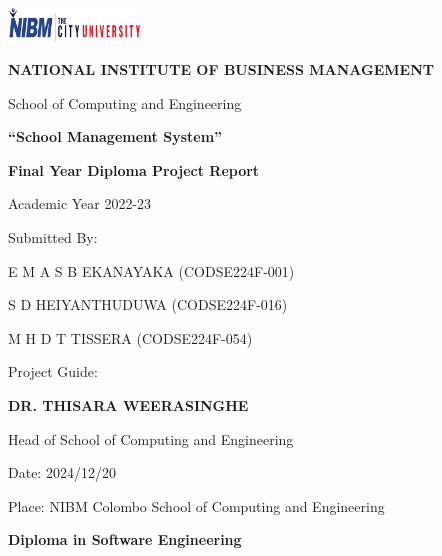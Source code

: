 \documentclass[12pt,a4paper]{report}
\begin{document}
\begin{titlepage}
    \centering
    \vspace*{0.3cm}
    
    \includegraphics[width=3.5cm]{nibm-logo.png} %
    
    \vspace{1cm}
    
    {\Huge\bfseries NATIONAL INSTITUTE OF BUSINESS MANAGEMENT}
    
    \vspace{1cm}
    
    {\Large School of Computing and Engineering}
    
    \vspace{1.2cm}
    
    {\Huge\bfseries ``School Management System''}
    
    \vspace{1.2cm}
    
    {\Large\bfseries Final Year Diploma Project Report}
    
    {\large Academic Year 2022-23}
    
    \vspace{1.5cm}
    
    {\Large Submitted By:}
    
    \vspace{0.5cm}
    
    {\large E M A S B EKANAYAKA (CODSE224F-001)}
    
    {\large S D HEIYANTHUDUWA (CODSE224F-016)}
    
    {\large M H D T TISSERA (CODSE224F-054)}
    
    \vspace{1cm}
    
    {\Large Project Guide:}
    
    \vspace{0.3cm}
    
    {\Large\bfseries DR. THISARA WEERASINGHE}
    
    {\large Head of School of Computing and Engineering}
    
    \vfill %
    
    {\large Date: 2024/12/20}
    
    {\large Place: NIBM Colombo School of Computing and Engineering}
    
    \vspace{0.5cm}
    
    {\Large\bfseries Diploma in Software Engineering}
    
\end{titlepage}
\end{document}
